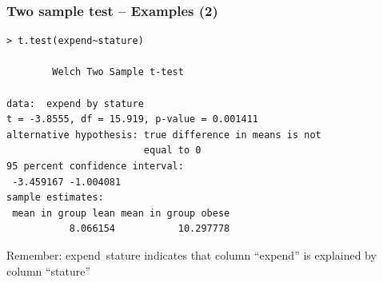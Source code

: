\documentclass[10pt]{beamer}
\begin{document}
\begin{frame}
  \frametitle{Two sample test -- Examples (2)}
\begin{verbatim}
> t.test(expend~stature)
                                                                                                           
        Welch Two Sample t-test                                                                            
                                                                                                           
data:  expend by stature                                                                                   
t = -3.8555, df = 15.919, p-value = 0.001411                                                               
alternative hypothesis: true difference in means is not
                        equal to 0                                         
95 percent confidence interval:                                                                            
 -3.459167 -1.004081                                                                                       
sample estimates:                                                                                          
 mean in group lean mean in group obese                                                                    
           8.066154           10.297778

\end{verbatim}
\begin{block}{}
\small{Remember: expend~stature indicates that column ``expend'' is explained by column ``stature''}
\end{block}
\end{frame}
\end{document}
